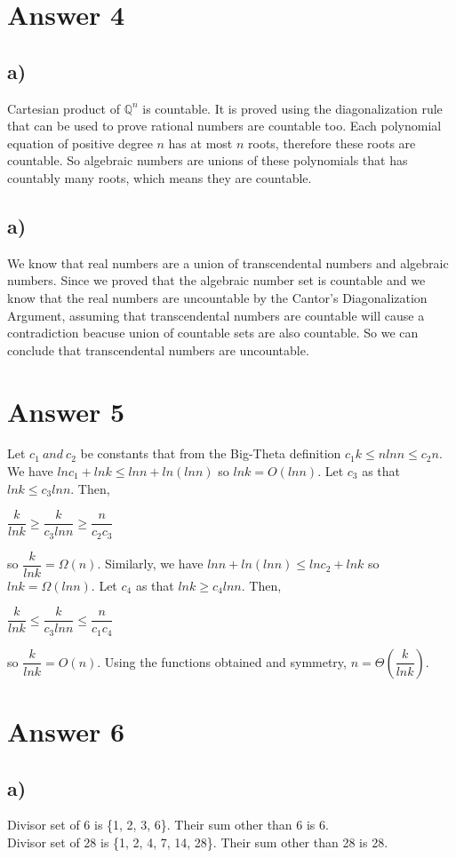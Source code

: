 \documentclass[12pt]{article}
\begin{document}
\section*{Answer 4}
\subsection*{a)}
Cartesian product of $\mathbb{Q}^n$ is countable. It is proved using the diagonalization rule that can be used to prove rational numbers are countable too. Each polynomial equation of positive degree $n$ has at most $n$ roots, therefore these roots are countable. So algebraic numbers are unions of these polynomials that has countably many roots, which means they are countable.
\subsection*{a)}
We know that real numbers are a union of transcendental numbers and algebraic numbers. Since we proved that the algebraic number set is countable and we know that the real numbers are uncountable by the Cantor's Diagonalization Argument, assuming that transcendental numbers are countable will cause a contradiction beacuse union of countable sets are also countable. So we can conclude that transcendental numbers are uncountable.
\section*{Answer 5}
Let $c_1\ and\ c_2$ be constants that from the Big-Theta definition $c_1k \leq nlnn \leq c_2n$. We have $lnc_1 + lnk \leq lnn + ln(lnn)$ so $lnk = O(lnn)$. Let $c_3$ as that $lnk \leq c_3lnn.$ Then,
\begin{center}
$\dfrac{k}{lnk} \geq \dfrac{k}{c_3lnn} \geq \dfrac{n}{c_2c_3}$
\end{center}
so $\dfrac{k}{lnk} = \Omega(n)$. Similarly, we have $lnn + ln(lnn) \leq lnc_2 + lnk$ so $lnk = \Omega(lnn)$. Let $c_4$ as that $lnk \geq c_4lnn.$ Then,
\begin{center}
$\dfrac{k}{lnk} \leq \dfrac{k}{c_3lnn} \leq \dfrac{n}{c_1c_4}$
\end{center}
so $\dfrac{k}{lnk} = O(n)$. Using the functions obtained and symmetry, $n = \Theta(\dfrac{k}{lnk})$.
\section*{Answer 6}
\subsection*{a)}
Divisor set of 6 is \{1, 2, 3, 6\}. Their sum other than 6 is 6.\\
Divisor set of 28 is \{1, 2, 4, 7, 14, 28\}. Their sum other than 28 is 28.\\
\end{document}
